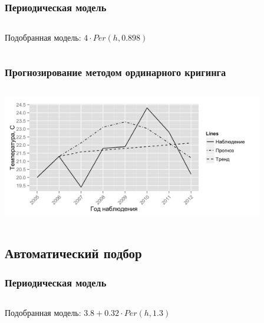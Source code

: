 \documentclass[10pt, pdf,aspectratio=169]{beamer}
\begin{document}
\begin{frame}
  \frametitle{Периодическая модель}   %
  \begin{columns}[c]
  \column{2in}  %
  Подобранная модель: $ 4 \cdot Per(h, 0.898) $
  \column{3in}
  \end{columns}
\end{frame}

\begin{frame}
  \frametitle{Прогнозирование методом ординарного кригинга}   %
   \begin{columns}[c]
   \column{4.5in}
   \includegraphics[width=4.5in]{../../figures/variogram/per-fit-cv-cross-prediction.png}
  \end{columns}
\end{frame}

\subsection{Автоматический подбор}

\begin{frame}
  \frametitle{Периодическая модель}   %
  \begin{columns}[c]
  \column{2in}  %
  Подобранная модель: $ 3.8 + 0.32 \cdot Per(h, 1.3) $
  \column{3in}
  \end{columns}
\end{frame}
\end{document}

